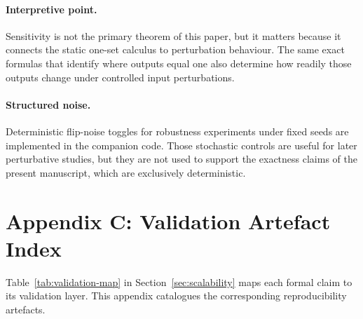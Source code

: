 \documentclass[11pt]{article}
\theoremstyle{definition}
\begin{document}
\paragraph{Interpretive point.}
Sensitivity is not the primary theorem of this paper, but it matters because it connects the static one-set calculus to perturbation behaviour. The same exact formulas that identify where outputs equal one also determine how readily those outputs change under controlled input perturbations.

\paragraph{Structured noise.}
Deterministic flip-noise toggles for robustness experiments under fixed seeds are implemented in the companion code. Those stochastic controls are useful for later perturbative studies, but they are not used to support the exactness claims of the present manuscript, which are exclusively deterministic.

\section{Appendix C: Validation Artefact Index}
Table~\ref{tab:validation-map} in Section~\ref{sec:scalability} maps each formal claim to its validation layer. This appendix catalogues the corresponding reproducibility artefacts.
\end{document}
